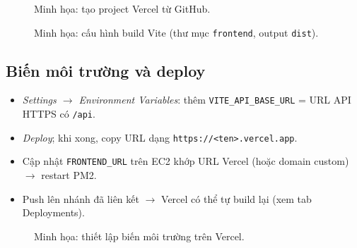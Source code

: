 \begin{figure}[H]
\centering
\caption{Minh họa: tạo project Vercel từ GitHub.}
\label{fig:deploy-vercel-new}
\end{figure}

\begin{figure}[H]
\centering
\caption{Minh họa: cấu hình build Vite (thư mục \texttt{frontend}, output \texttt{dist}).}
\label{fig:deploy-vercel-build}
\end{figure}

\subsection{Biến môi trường và deploy}

\begin{itemize}
    \item \textit{Settings $\rightarrow$ Environment Variables}: thêm \texttt{VITE\_API\_BASE\_URL} = URL API HTTPS có \texttt{/api}.
    \item \textit{Deploy}; khi xong, copy URL dạng \texttt{https://<ten>.vercel.app}.
    \item Cập nhật \texttt{FRONTEND\_URL} trên EC2 khớp URL Vercel (hoặc domain custom) $\rightarrow$ restart PM2.
    \item Push lên nhánh đã liên kết $\rightarrow$ Vercel có thể tự build lại (xem tab Deployments).
\end{itemize}

\begin{figure}[H]
\centering
\caption{Minh họa: thiết lập biến môi trường trên Vercel.}
\label{fig:deploy-vercel-env}
\end{figure}

